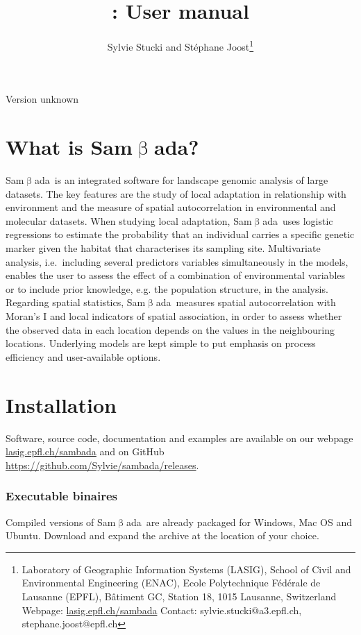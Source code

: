 \documentclass[a4paper,11pt]{article}
\date{ \printdate{\releasedate} }
\title{\smb: User manual}
\author{Sylvie Stucki and Stéphane Joost\footnote{
Laboratory of Geographic Information Systems (LASIG), School of Civil and Environmental Engineering (ENAC), Ecole Polytechnique Fédérale de Lausanne (EPFL), Bâtiment GC, Station 18, 1015 Lausanne, Switzerland \newline
Webpage: \protect\url{lasig.epfl.ch/sambada} \newline Contact: sylvie.stucki@a3.epfl.ch, stephane.joost@epfl.ch
}}
\newcommand{\versionnumber}{unknown}
\newcommand{\smb}{\textsf{Sam$\upbeta$ada}}
\newcommand{\smbtitre}{\protect\texorpdfstring{\smb}{Samßada}}
\begin{document}
\maketitle

\vspace{-1.25cm}
\begin{center}
\small Version \versionnumber
\end{center}

\vfill

\tableofcontents

\vfill

\clearpage

\section{What is \smbtitre?}

\smb\ is an integrated software for landscape genomic analysis of large datasets. 
The key features are the study of local adaptation in relationship with environment and the measure of spatial autocorrelation in environmental and molecular datasets.
When studying local adaptation, \smb\ uses logistic regressions to estimate the probability that an individual carries a specific genetic marker given the habitat that characterises its sampling site.
Multivariate analysis, i.e.~including several predictors variables simultaneously in the models, enables the user to assess the effect of a combination of environmental variables or to include prior knowledge, e.g. the population structure, in the analysis.
Regarding spatial statistics, \smb\ measures spatial autocorrelation with Moran's I and local indicators of spatial association, in order to assess whether the observed data in each location depends on the values in the neighbouring locations.
Underlying models are kept simple to put emphasis on process efficiency and user-available options.



\section{Installation}
Software, source code, documentation and examples are available on our webpage \url{lasig.epfl.ch/sambada} and on GitHub \url{https://github.com/Sylvie/sambada/releases}.

\subsubsection*{Executable binaires}
Compiled versions of \smb\ are already packaged for Windows, Mac OS and Ubuntu.
Download and expand the archive at the location of your choice.
\end{document}
